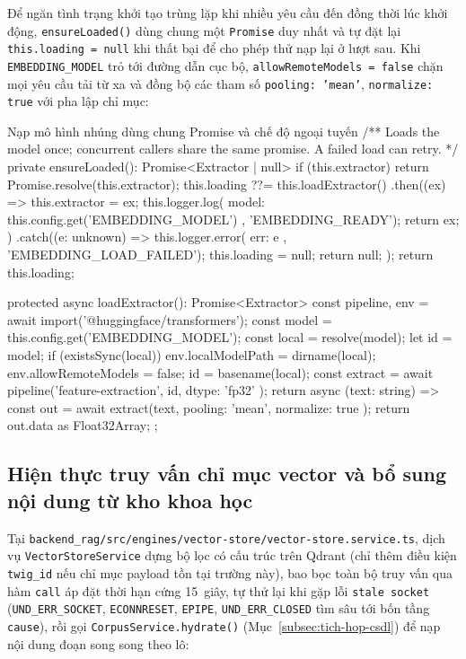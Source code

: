 Để ngăn tình trạng khởi tạo trùng lặp khi nhiều yêu cầu đến đồng thời lúc khởi động, \texttt{ensureLoaded()} dùng chung một \texttt{Promise} duy nhất và tự đặt lại \texttt{this.loading = null} khi thất bại để cho phép thử nạp lại ở lượt sau. Khi \texttt{EMBEDDING\_MODEL} trỏ tới đường dẫn cục bộ, \texttt{allowRemoteModels = false} chặn mọi yêu cầu tải từ xa và đồng bộ các tham số \texttt{pooling: 'mean'}, \texttt{normalize: true} với pha lập chỉ mục:

\begin{tsbox}{Nạp mô hình nhúng dùng chung Promise và chế độ ngoại tuyến}
/** Loads the model once; concurrent callers share the same promise. A failed load can retry. */
private ensureLoaded(): Promise<Extractor | null> {
  if (this.extractor) return Promise.resolve(this.extractor);
  this.loading ??= this.loadExtractor()
    .then((ex) => {
      this.extractor = ex;
      this.logger.log({ model: this.config.get('EMBEDDING_MODEL') }, 'EMBEDDING_READY');
      return ex;
    })
    .catch((e: unknown) => {
      this.logger.error({ err: e }, 'EMBEDDING_LOAD_FAILED');
      this.loading = null;
      return null;
    });
  return this.loading;
}

protected async loadExtractor(): Promise<Extractor> {
  const { pipeline, env } = await import('@huggingface/transformers');
  const model = this.config.get('EMBEDDING_MODEL');
  const local = resolve(model);
  let id = model;
  if (existsSync(local)) {
    env.localModelPath = dirname(local);
    env.allowRemoteModels = false;
    id = basename(local);
  }
  const extract = await pipeline('feature-extraction', id, { dtype: 'fp32' });
  return async (text: string) => {
    const out = await extract(text, { pooling: 'mean', normalize: true });
    return out.data as Float32Array;
  };
}
\end{tsbox}

\subsection{Hiện thực truy vấn chỉ mục vector và bổ sung nội dung từ kho khoa học}
\label{subsec:truy-van-vector-kho}

Tại \texttt{backend\_\allowbreak{}rag/\allowbreak{}src/\allowbreak{}engines/\allowbreak{}vector-\allowbreak{}store/\allowbreak{}vector-\allowbreak{}store.\allowbreak{}service.\allowbreak{}ts}, dịch vụ \texttt{Vector\allowbreak{}Store\allowbreak{}Service} dựng bộ lọc có cấu trúc trên Qdrant (chỉ thêm điều kiện \texttt{twig\_\allowbreak{}id} nếu chỉ mục payload tồn tại trường này), bao bọc toàn bộ truy vấn qua hàm \texttt{call} áp đặt thời hạn cứng 15~giây, tự thử lại khi gặp lỗi \texttt{stale socket} (\texttt{UND\_\allowbreak{}ERR\_\allowbreak{}SOCKET}, \texttt{ECONN\allowbreak{}RESET}, \texttt{EPIPE}, \texttt{UND\_\allowbreak{}ERR\_\allowbreak{}CLOSED} tìm sâu tới bốn tầng \texttt{cause}), rồi gọi \texttt{Corpus\allowbreak{}Service.\allowbreak{}hydrate()} (Mục~\ref{subsec:tich-hop-csdl}) để nạp nội dung đoạn song song theo lô:

